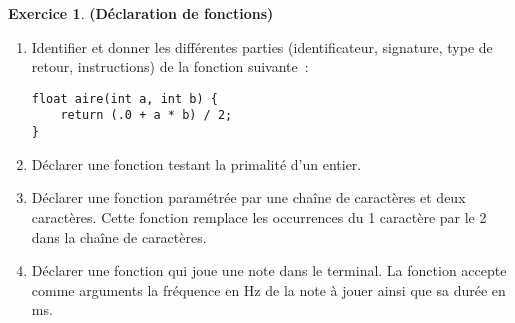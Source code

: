 \documentclass[12pt]{article}
\theoremstyle{definition}
\newtheorem{Exercice}{Exercice}
\begin{document}
\begin{Exercice} {\bf (Déclaration de fonctions)}\smallskip

\begin{enumerate}
    \item Identifier et donner les différentes parties
    (identificateur, signature, type de retour, instructions) de la
    fonction suivante~:
    \begin{lstlisting}
float aire(int a, int b) {
    return (.0 + a * b) / 2;
}
    \end{lstlisting}
    \smallskip

    \item Déclarer une fonction testant la primalité d'un entier.
    \smallskip

    \item Déclarer une fonction paramétrée par une chaîne de caractères
    et deux caractères. Cette fonction remplace les occurrences du
    1\ier{} caractère par le 2\ieme{} dans la chaîne de caractères.
    \smallskip

    \item Déclarer une fonction qui joue une note dans le terminal.
    La fonction accepte comme arguments la fréquence en Hz de
    la note à jouer ainsi que sa durée en ms.
\end{enumerate}
\end{Exercice}
\bigskip
\end{document}

